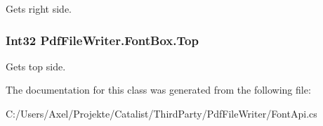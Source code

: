 Gets right side. 

\subsubsection[{\texorpdfstring{Top}{Top}}]{\setlength{\rightskip}{0pt plus 5cm}Int32 Pdf\+File\+Writer.\+Font\+Box.\+Top\hspace{0.3cm}{\ttfamily [get]}}\hypertarget{class_pdf_file_writer_1_1_font_box_a466058d51f79d470562e244eb005384c}{}\label{class_pdf_file_writer_1_1_font_box_a466058d51f79d470562e244eb005384c}


Gets top side. 



The documentation for this class was generated from the following file\+:\begin{DoxyCompactItemize}
\item 
C\+:/\+Users/\+Axel/\+Projekte/\+Catalist/\+Third\+Party/\+Pdf\+File\+Writer/Font\+Api.\+cs\end{DoxyCompactItemize}
